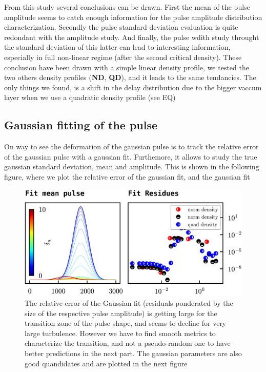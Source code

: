 \documentclass[11pt,a4paper,openany]{report}
\begin{document}
\begin{multicols}{2}
    From this study several conclusions can be drawn. First the mean of the pulse amplitude seems to catch enough information for the pulse amplitude distribution characterization. Secondly the pulse standard deviation evaluation is quite redondant with the amplitude study. And finally, the pulse wdith study throught the standard deviation of this latter can lead to interesting information, especially in full non-linear regime (after the second critical density). These conclusion have been drawn with a simple linear density profile,  we tested the two others density profiles (\textbf{ND}, \textbf{QD}), and it leads to the same tendancies. The only things we found, is a shift in the delay distribution due to the bigger vaccum layer when we use a quadratic density profile (see EQ)

    \subsection{Gaussian fitting of the pulse}
    On way to see the deformation of the gaussian pulse is to track the relative error of the gaussian pulse with a gaussian fit. Furthemore, it allows to study the true gaussian standard deviation, mean and amplitude.
    This is shown in the following figure, where we plot the relative error of the gaussian fit, and the gaussian fit
    \begin{figure}[H]
        \centering
        \includegraphics[width=1\linewidth]{./figures/gaussian_fit.png}
        \caption{The relative error of the Gaussian fit (residuals ponderated by the size of the respective pulse amplitude) is getting large for the transition zone of the pulse shape, and seems to decline for very large turbulence. However we have to find smooth metrics to characterize the transition, and not a pseudo-random one to have better predictions in the next part.
            The gaussian parameters are also good quandidates and are plotted in the next figure }
        \label{}
    \end{figure}


\end{multicols}
\end{document}

